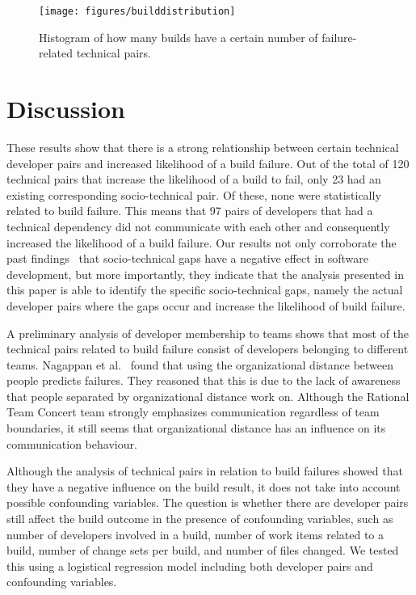 \begin{figure}[t]
\centering
\vspace{-1cm}
\texttt{[image: figures/builddistribution]}
\vspace{-.75cm}
\caption{Histogram of how many builds have a certain number of failure-related technical pairs.}
\label{fig:builddistribution}
\end{figure}

\section{Discussion}
\label{ch8:dis}
These results show that there is a strong relationship between certain technical
developer pairs and increased likelihood of a build failure.
Out of the total of 120 technical pairs that increase the likelihood of a
build to fail, only 23 had an existing
corresponding socio-technical pair. Of these, none were statistically
related to build failure. This means that 97 pairs of developers that had a
technical dependency did not communicate with each other and
consequently increased the likelihood of a build failure. Our results not only
corroborate the past findings~\cite{cataldo:cscw:2006,cataldo:esem:2008} that socio-technical gaps
have a negative effect in software development, but more importantly, they indicate
that the analysis presented in this paper is able to identify the specific
socio-technical gaps, namely the actual developer pairs where the gaps occur
and increase the likelihood of build failure. 

A preliminary analysis of developer membership to teams shows that most
of the technical pairs related to build failure consist of developers belonging to
different teams. Nagappan et al.~\cite{nagappan:icse:2008} found that using the
organizational distance between people predicts failures. They reasoned that this
is due to the lack of awareness that people separated by organizational distance
work on. Although the Rational Team Concert team strongly emphasizes communication
regardless of team boundaries, it still seems that organizational distance has
an influence on its communication behaviour.


Although the analysis of technical pairs in relation to build failures
showed that they have a negative influence on the build result, it does not take
into account possible confounding variables. The question is whether there are developer pairs still affect the build outcome in the presence of confounding variables, such as number of developers involved in a build, number of work items
related to a build, number of change sets per build, and number of files changed.
We tested this using a logistical regression model including both developer pairs and confounding variables.

